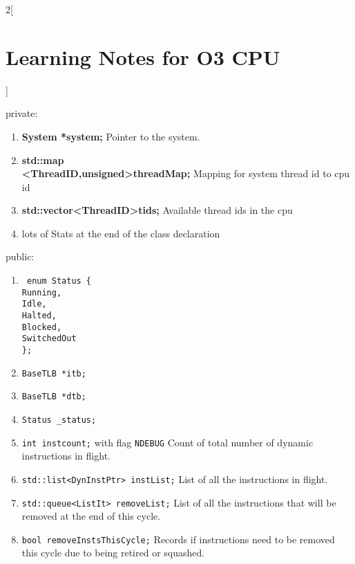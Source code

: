 \documentclass[11pt]{article}
\begin{document}
\begin{multicols}{2}[\section{Learning Notes for O3 CPU}]
\begin{enumerate}
\begin{enumerate}[label={\arabic*.}]
			\end{enumerate}
			
		private:
		\begin{enumerate}[label={\arabic*.}]
			\item \textbf{System *system;} Pointer to the system.
			\item \textbf{std::map\\\textless ThreadID,unsigned\textgreater threadMap;} Mapping for system thread id to cpu id
			\item \textbf{std::vector\textless ThreadID\textgreater tids;} Available thread ids in the cpu
			\item lots of Stats at the end of the class declaration
		\end{enumerate}
			
			
		public:
			\begin{enumerate}[label={\arabic*.}]
				\item \texttt{    enum Status \{\\
        						\-\hspace{1cm}	Running,\\
        						\-\hspace{1cm}	Idle,\\
        						\-\hspace{1cm}	Halted,\\
        						\-\hspace{1cm}	Blocked,\\
        						\-\hspace{1cm}	SwitchedOut\\
    												\};}
    		\item \texttt{BaseTLB *itb;}
    		\item \texttt{BaseTLB *dtb;}
    		\item \texttt{Status \_status;}
    		\item \texttt{int instcount;} with flag \texttt{NDEBUG} Count of total number of dynamic instructions in flight.
    		\item \texttt{std::list<DynInstPtr> instList;} List of all the instructions in flight.
    		\item \texttt{std::queue<ListIt> removeList;} List of all the instructions that will be removed at the end of this cycle.
    		\item \texttt{bool removeInstsThisCycle;} Records if instructions need to be removed this cycle due to being retired or squashed.
			\end{enumerate}
	\end{enumerate}

\end{multicols}
\end{document}

